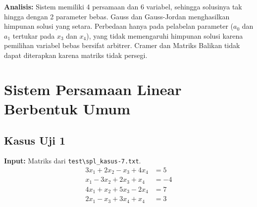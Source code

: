 \documentclass[12pt,a4paper]{report}
\begin{document}
\textbf{Analisis:} Sistem memiliki 4 persamaan dan 6 variabel, sehingga solusinya tak hingga dengan 2 parameter bebas. Gauss dan Gauss-Jordan menghasilkan himpunan solusi yang setara. Perbedaan hanya pada pelabelan parameter ($a_0$ dan $a_1$ tertukar pada $x_3$ dan $x_4$), yang tidak memengaruhi himpunan solusi karena pemilihan variabel bebas bersifat arbitrer. Cramer dan Matriks Balikan tidak dapat diterapkan karena matriks tidak persegi.

\section{Sistem Persamaan Linear Berbentuk Umum}
 
\subsection{Kasus Uji 1}
\textbf{Input:} Matriks dari \texttt{test\textbackslash spl\_kasus-7.txt}.
\begin{align*}
3x_1 + 2x_2 - x_3 + 4x_4 &= 5 \\
x_1 - 3x_2 + 2x_3 + x_4 &= -4 \\
4x_1 + x_2 + 5x_3 - 2x_4 &= 7 \\
2x_1 - x_3 + 3x_4 + x_4&= 3
\end{align*}
\end{document}
